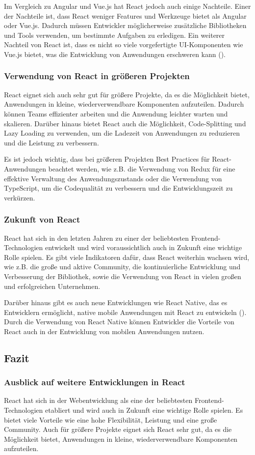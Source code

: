 Im Vergleich zu Angular und Vue.js hat React jedoch auch einige Nachteile. Einer der Nachteile ist, dass React weniger Features und Werkzeuge bietet als Angular oder Vue.js. Dadurch müssen Entwickler möglicherweise zusätzliche Bibliotheken und Tools verwenden, um bestimmte Aufgaben zu erledigen. Ein weiterer Nachteil von React ist, dass es nicht so viele vorgefertigte UI-Komponenten wie Vue.js bietet, was die Entwicklung von Anwendungen erschweren kann (\cite{Kruschecompany}).
\subsubsection{Verwendung von React in größeren Projekten}
React eignet sich auch sehr gut für größere Projekte, da es die Möglichkeit bietet, Anwendungen in kleine, wiederverwendbare Komponenten aufzuteilen. Dadurch können Teams effizienter arbeiten und die Anwendung leichter warten und skalieren. Darüber hinaus bietet React auch die Möglichkeit, Code-Splitting und Lazy Loading zu verwenden, um die Ladezeit von Anwendungen zu reduzieren und die Leistung zu verbessern.

Es ist jedoch wichtig, dass bei größeren Projekten Best Practices für React-Anwendungen beachtet werden, wie z.B. die Verwendung von Redux für eine effektive Verwaltung des Anwendungszustands oder die Verwendung von TypeScript, um die Codequalität zu verbessern und die Entwicklungszeit zu verkürzen.
\subsubsection{Zukunft von React}
React hat sich in den letzten Jahren zu einer der beliebtesten Frontend-Technologien entwickelt und wird voraussichtlich auch in Zukunft eine wichtige Rolle spielen. Es gibt viele Indikatoren dafür, dass React weiterhin wachsen wird, wie z.B. die große und aktive Community, die kontinuierliche Entwicklung und Verbesserung der Bibliothek, sowie die Verwendung von React in vielen großen und erfolgreichen Unternehmen.

Darüber hinaus gibt es auch neue Entwicklungen wie React Native, das es Entwicklern ermöglicht, native mobile Anwendungen mit React zu entwickeln (\cite{LeanOcean}). Durch die Verwendung von React Native können Entwickler die Vorteile von React auch in der Entwicklung von mobilen Anwendungen nutzen.
\subsection{Fazit}
\subsubsection{Ausblick auf weitere Entwicklungen in React}
React hat sich in der Webentwicklung als eine der beliebtesten Frontend-Technologien etabliert und wird auch in Zukunft eine wichtige Rolle spielen. Es bietet viele Vorteile wie eine hohe Flexibilität, Leistung und eine große Community. Auch für größere Projekte eignet sich React sehr gut, da es die Möglichkeit bietet, Anwendungen in kleine, wiederverwendbare Komponenten aufzuteilen.

